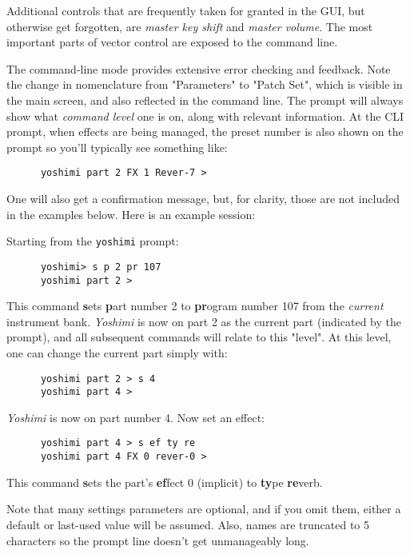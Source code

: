    Additional controls that are frequently taken for granted in the GUI, but
   otherwise get forgotten, are \textsl{master key shift} and \textsl{master
   volume}.  The most important parts of vector control are exposed to the
   command line.

   The command-line mode provides extensive error checking and feedback.
   Note the change in nomenclature from "Parameters" to "Patch Set", which is
   visible in the main screen, and also reflected in the command line.
   The prompt will always show what \textsl{command level}
   one is on, along with relevant information.
   At the CLI prompt, when effects are being managed, the preset number is also
   shown on the prompt so you'll typically see something like:

   \begin{verbatim}
      yoshimi part 2 FX 1 Rever-7 >
   \end{verbatim}

   One will also get a confirmation message, but, for clarity,
   those are not included in the examples below.
   Here is an example session:

   Starting from the \texttt{yoshimi} prompt:

   \begin{verbatim}
      yoshimi> s p 2 pr 107
      yoshimi part 2 >
   \end{verbatim}

   This command \textbf{s}ets \textbf{p}art number 2 to \textbf{pr}ogram
   number 107 from the \textsl{current} instrument bank.
   \textsl{Yoshimi} is now on part 2 as the current part (indicated by the
   prompt), and all subsequent commands will relate to this "level".
   At this level, one can change the current part simply with:

   \begin{verbatim}
      yoshimi part 2 > s 4
      yoshimi part 4 >
   \end{verbatim}

   \textsl{Yoshimi} is now on part number 4. Now set an effect:

   \begin{verbatim}
      yoshimi part 4 > s ef ty re
      yoshimi part 4 FX 0 rever-0 >
   \end{verbatim}

   This command \textbf{s}ets the part's \textbf{ef}fect 0 (implicit) to
   \textbf{ty}pe \textbf{re}verb.

   Note that many settings parameters are optional, and if you omit them,
   either a default or last-used value will be assumed. Also, names are
   truncated to 5 characters so the prompt line doesn't get unmanageably long.


